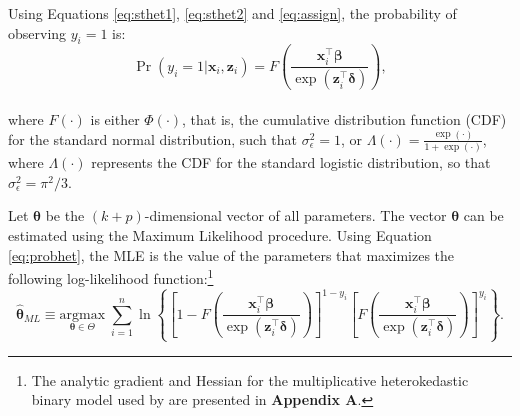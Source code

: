 Using Equations \eqref{eq:sthet1}, \eqref{eq:sthet2} and \eqref{eq:assign}, the probability of observing \(y_i = 1\) is:
\begin{equation}
    \Pr(y_i = 1|\mathbf x_i, \mathbf z_i) = F\left(\frac{\mathbf x_i^\top\boldsymbol \beta}{\exp(\mathbf z_i^\top\boldsymbol \delta)}\right), 
    \label{eq:probhet}
\end{equation}\\
where \(F(\cdot)\) is either \(\Phi(\cdot)\), that is, the cumulative distribution function (CDF) for the standard normal distribution, such that \(\sigma_{\epsilon}^2 = 1\), or \(\Lambda(\cdot) = \frac{\exp(\cdot)}{1 + \exp(\cdot)}\), where \(\Lambda(\cdot)\) represents the CDF for the standard logistic distribution, so that \(\sigma_{\epsilon}^2 = \pi^2/3\).

Let \(\boldsymbol \theta\) be the \((k + p)\)-dimensional vector of all parameters. The vector \(\boldsymbol \theta\) can be estimated using the Maximum Likelihood procedure. Using Equation \eqref{eq:probhet}, the MLE is the value of the parameters that maximizes the following log-likelihood function:\footnote{The analytic gradient and Hessian for the multiplicative heterokedastic binary model used by  are presented in \textbf{Appendix A}.}
\begin{equation*}
    \widehat{\boldsymbol \theta}_{ML} \equiv \underset{\boldsymbol \theta\in \boldsymbol \varTheta}{\textrm{argmax}}\; \sum_{i = 1}^n \ln \left\lbrace \left[1- F\left(\frac{\mathbf x_i^\top\boldsymbol \beta}{\exp(\mathbf z_i^\top\boldsymbol \delta)}\right)\right]^{1-y_i}\left[F\left(\frac{\mathbf x_i^\top\boldsymbol \beta}{\exp(\mathbf z_i^\top\boldsymbol \delta)}\right)\right]^{y_i}\right\rbrace.
\end{equation*}

